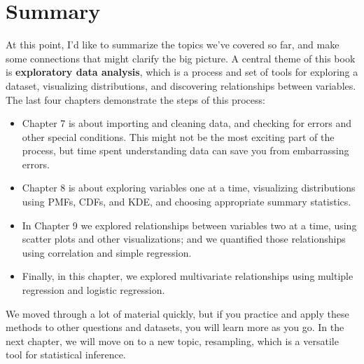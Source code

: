 \section{Summary}\label{summary}

At this point, I'd like to summarize the topics we've covered so far,
and make some connections that might clarify the big picture. A central
theme of this book is \textbf{exploratory data analysis}, which is a
process and set of tools for exploring a dataset, visualizing
distributions, and discovering relationships between variables. The last
four chapters demonstrate the steps of this process:

\begin{itemize}
\item
  Chapter 7 is about importing and cleaning data, and checking for
  errors and other special conditions. This might not be the most
  exciting part of the process, but time spent understanding data can
  save you from embarrassing errors.
\item
  Chapter 8 is about exploring variables one at a time, visualizing
  distributions using PMFs, CDFs, and KDE, and choosing appropriate
  summary statistics.
\item
  In Chapter 9 we explored relationships between variables two at a
  time, using scatter plots and other visualizations; and we quantified
  those relationships using correlation and simple regression.
\item
  Finally, in this chapter, we explored multivariate relationships using
  multiple regression and logistic regression.
\end{itemize}

We moved through a lot of material quickly, but if you practice and
apply these methods to other questions and datasets, you will learn more
as you go. In the next chapter, we will move on to a new topic,
resampling, which is a versatile tool for statistical inference.
